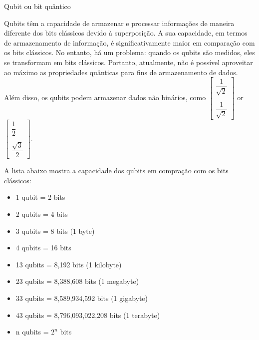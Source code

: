 \begin{frame}[allowframebreaks]{Qubit ou bit quântico}
		\par Qubits têm a capacidade de armazenar e processar informações de maneira diferente dos bits clássicos devido à superposição. A sua capacidade, em termos de armazenamento de informação, é significativamente maior em comparação com os bits clássicos. No entanto, há um problema: quando os qubits são medidos, eles se transformam em bits clássicos. Portanto, atualmente, não é possível aproveitar ao máximo as propriedades quânticas para fins de armazenamento de dados. Além disso, os qubits podem armazenar dados não binários, como	 $\begin{bmatrix} \dfrac{1}{\sqrt{2}} \\\\ \dfrac{1}{\sqrt{2}} \end{bmatrix}$ or $\begin{bmatrix} \dfrac{1}{2} \\\\ \dfrac{\sqrt{3}}{2} \end{bmatrix}$.
		
		\framebreak
		
		\par A lista abaixo mostra a capacidade dos qubits em compração com os bits clássicos:
		
		\begin{itemize}
			\label{lst:qubits}
			\item 1 qubit = 2 bits
			\item 2 qubits = 4 bits
			\item 3 qubits = 8 bits (1 byte)
			\item 4 qubits = 16 bits
			\item 13 qubits = 8,192 bits (1 kilobyte)
			\item 23 qubits = 8,388,608 bits (1 megabyte)
			\item 33 qubits = 8,589,934,592 bits (1 gigabyte)
			\item 43 qubits = 8,796,093,022,208 bits (1 terabyte)
			\item n qubits = $2^n$ bits
		\end{itemize}
	\end{frame}
	
